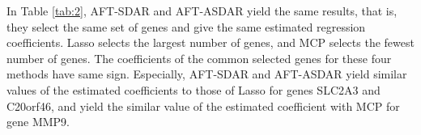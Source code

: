 \documentclass[12pt]{article}
\begin{document}
In Table \ref{tab:2}, AFT-SDAR and AFT-ASDAR yield the same results, that is, they select the same set of genes and give the same estimated regression coefficients.
Lasso selects the largest number of genes, and MCP selects  the fewest number of genes.  The  coefficients of the common selected genes for these four methods have same sign. Especially,  AFT-SDAR and AFT-ASDAR yield similar values of the  estimated coefficients to those of Lasso for  genes SLC2A3 and C20orf46, and yield the similar value of the estimated coefficient with MCP for gene MMP9.
\begin{table}
\caption{The estimation results of nki70}
\label{tab:2}
\begin{center}
\end{center}
\end{table}
\end{document}
